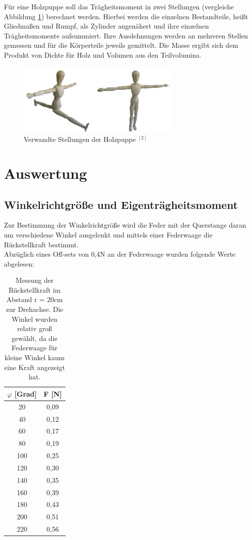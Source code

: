 Für eine Holzpuppe soll das Trägheitsmoment in zwei Stellungen (vergleiche Abbildung \ref{pic_puppe}) berechnet werden. Hierbei werden
die einzelnen Bestandteile, heißt Gliedmaßen und Rumpf, als Zylinder angenähert und ihre einzelnen Trägheitsmomente aufsummiert. Ihre 
Ausdehnungen werden an mehreren Stellen gemessen und für die Körperteile jeweils gemittelt. Die Masse ergibt sich dem Produkt von Dichte für Holz
und Volumen aus den Teilvolumina.

\begin{figure}[H]
\includegraphics[width=0.7\textwidth]{pics/puppe.png}
\caption{Verwandte Stellungen der Holzpuppe $^{[2]}$}
\label{pic_puppe}
\end{figure}

\section{Auswertung}
\subsection{Winkelrichtgröße und Eigenträgheitsmoment}
Zur Bestimmung der Winkelrichtgröße wird die Feder mit der Querstange daran um verschiedene Winkel ausgelenkt und mittels einer Federwaage die Rückstellkraft bestimmt.\\
Abzüglich eines Off-sets von 0,4N an der Federwaage wurden folgende Werte abgelesen:
\begin{table}[H]
\renewcommand{\arraystretch}{.95}
\begin{tabular}{|c|c|}
\hline 
$\varphi$ [Grad]&	F [N]\\ \hline
20	&0,09\\ \hline
40	&0,12\\ \hline
60	&0,17\\ \hline
80	&0,19\\ \hline
100	&0,25\\ \hline
120	&0,30\\ \hline
140	&0,35\\ \hline
160	&0,39\\ \hline
180	&0,43\\ \hline
200	&0,51\\ \hline
220	&0,56\\ \hline
\end{tabular} 
\renewcommand{\arraystretch}{1}
\caption{Messung der Rückstellkraft im Abstand r = 20cm zur Drehachse. Die Winkel wurden relativ groß gewählt, da die Federwaage für kleine Winkel kaum eine Kraft angezeigt hat.}
\end{table}


